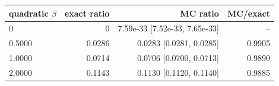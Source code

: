 \begin{tabular}{lrrr}
\toprule
quadratic $\beta$ & exact ratio & MC ratio & MC/exact \\
\midrule
0 & 0 & 7.59e-33 [7.52e-33, 7.65e-33] & -- \\
0.5000 & 0.0286 & 0.0283 [0.0281, 0.0285] & 0.9905 \\
1.0000 & 0.0714 & 0.0706 [0.0700, 0.0713] & 0.9890 \\
2.0000 & 0.1143 & 0.1130 [0.1120, 0.1140] & 0.9885 \\
\bottomrule
\end{tabular}
